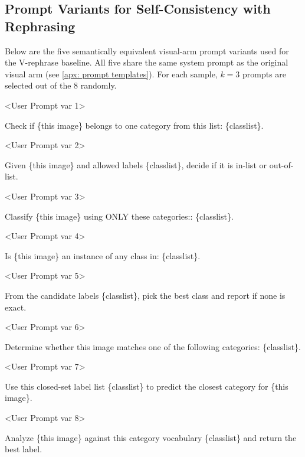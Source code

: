 \documentclass[10pt]{article} %
\begin{document}
\subsection{Prompt Variants for Self-Consistency with Rephrasing} \label{apx: prompt vars}
Below are the five semantically equivalent visual-arm prompt variants used for the V-rephrase baseline. All five share the same system prompt as the original visual arm (see \ref{apx: prompt templates}). For each sample, $k=3$ prompts are selected out of the 8 randomly.
\begin{promptquote}
<User Prompt var 1> 

Check if \{this image\} belongs to one category from this list: \{classlist\}.
\end{promptquote}
\begin{promptquote}
<User Prompt var 2> 

Given \{this image\} and allowed labels \{classlist\}, decide if it is in-list or out-of-list.
\end{promptquote}
\begin{promptquote}
<User Prompt var 3> 

Classify \{this image\} using ONLY these categories:: \{classlist\}.
\end{promptquote}
\begin{promptquote}
<User Prompt var 4> 

Is \{this image\} an instance of any class in: \{classlist\}.
\end{promptquote}
\begin{promptquote}
<User Prompt var 5> 

From the candidate labels \{classlist\}, pick the best class and report if none is exact.
\end{promptquote}
\begin{promptquote}
<User Prompt var 6> 

Determine whether this image matches one of the following categories: \{classlist\}.
\end{promptquote}
\begin{promptquote}
<User Prompt var 7> 

Use this closed-set label list \{classlist\} to predict the closest category for \{this image\}.
\end{promptquote}
\begin{promptquote}
<User Prompt var 8> 

Analyze \{this image\} against this category vocabulary \{classlist\} and return the best label.
\end{promptquote}
\end{document}
